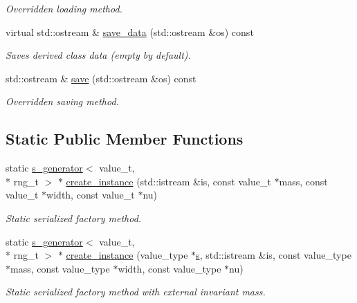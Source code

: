\begin{DoxyCompactItemize}
\begin{DoxyCompactList}\small\item\em Overridden loading method. \end{DoxyCompactList}\item 
\hypertarget{a00482_a7285cd262ea434cf6cd920f9a732507a}{virtual std\-::ostream \& \hyperlink{a00482_a7285cd262ea434cf6cd920f9a732507a}{save\-\_\-data} (std\-::ostream \&os) const }\label{a00482_a7285cd262ea434cf6cd920f9a732507a}

\begin{DoxyCompactList}\small\item\em Saves derived class data (empty by default). \end{DoxyCompactList}\item 
\hypertarget{a00482_a5bebd6a0894d3fc34c4f87ba9da21073}{std\-::ostream \& \hyperlink{a00482_a5bebd6a0894d3fc34c4f87ba9da21073}{save} (std\-::ostream \&os) const }\label{a00482_a5bebd6a0894d3fc34c4f87ba9da21073}

\begin{DoxyCompactList}\small\item\em Overridden saving method. \end{DoxyCompactList}\end{DoxyCompactItemize}
\subsection*{Static Public Member Functions}
\begin{DoxyCompactItemize}
\item 
\hypertarget{a00482_a889b3cca9b41762e01512b2c45a694bb}{static \hyperlink{a00482}{s\-\_\-generator}$<$ value\-\_\-t, \\*
rng\-\_\-t $>$ $\ast$ \hyperlink{a00482_a889b3cca9b41762e01512b2c45a694bb}{create\-\_\-instance} (std\-::istream \&is, const value\-\_\-t $\ast$mass, const value\-\_\-t $\ast$width, const value\-\_\-t $\ast$nu)}\label{a00482_a889b3cca9b41762e01512b2c45a694bb}

\begin{DoxyCompactList}\small\item\em Static serialized factory method. \end{DoxyCompactList}\item 
\hypertarget{a00482_a849866b3c639b1129cf17a47aa62de60}{static \hyperlink{a00482}{s\-\_\-generator}$<$ value\-\_\-t, \\*
rng\-\_\-t $>$ $\ast$ \hyperlink{a00482_a849866b3c639b1129cf17a47aa62de60}{create\-\_\-instance} (value\-\_\-type $\ast$\hyperlink{a00482_a8bf50336c0da12a27a71eb1154a7012e}{s}, std\-::istream \&is, const value\-\_\-type $\ast$mass, const value\-\_\-type $\ast$width, const value\-\_\-type $\ast$nu)}\label{a00482_a849866b3c639b1129cf17a47aa62de60}

\begin{DoxyCompactList}\small\item\em Static serialized factory method with external invariant mass. \end{DoxyCompactList}\end{DoxyCompactItemize}
